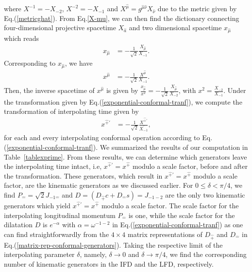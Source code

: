 \documentclass[%
 reprint,
superscriptaddress,
 amsmath,amssymb,
 aps,
]{revtex4-2}
\begin{document}
where ${X}^{-1}=-{X}_{-2}$, ${X}^{-2}=-{X}_{-1}$ and $X^{\hat \mu}=g^{\hat{\mu}\hat{\nu}}X_{\hat{\nu}}$ due to the metric
given by Eq.(\ref{metricghat}).
From Eq.\eqref{X-mu}, we can then find 
the dictionary connecting four-dimensional projective spacetime $X_{\hat{a}}$ and two dimensional spacetime $x_{\hat{\mu}}$ which reads
\begin{align}
    x_{\hat{\mu}}&=-\frac{1}{\sqrt{2}}\frac{{X}_{\hat{\mu}}}{ {X}_{-1}}.
\end{align}
Corresponding to $x_{\hat{\mu}}$, we have  
\begin{align}
    x^{\hat{\mu}}&=-\frac{1}{\sqrt{2}}\frac{{X}^{\hat{\mu}}}{ {X}_{-1}}.
\end{align}
Then, the inverse spacetime of $x^{\hat{\mu}}$ is given by $\frac{x_{\hat{\mu}}}{x^2}=-\frac{1}{\sqrt{2}}\frac{{X}_{\hat{\mu}}}{{X}_{-2}}$, with $x^2=\frac{{X}_{-2}}{{X}_{-1}}$. Under the transformation given by Eq.(\ref{exponential-conformal-tranf}), we compute the transformation of interpolating time given by
\begin{align}
    x^{\hat{+}\prime}&=-\frac{1}{\sqrt{2}}\frac{{X}^{\hat{+}\prime}}{ {X}^{\prime}_{-1}},
\end{align}
for each and every interpolating conformal operation according to Eq.(\ref{exponential-conformal-tranf}). We summarized the results of our computation in Table~\ref{tablexprime}.
From these results, we can determine which generators leave the interpolating time intact, i.e, $x^{\hat{+}\prime} = x^{\hat{+}}$ modulo a scale factor, before and after the transformation. These generators, which result in $x^{\hat{+}\prime}=x^{\hat{+}}$ modulo a scale factor, are the kinematic generators as we discussed earlier. For $0\leq \delta < \pi/4$, we find $P_{\hat -} = \sqrt{2}J_{-1\hat{-}}$ and $D=\left(D_{\hat{+}}c+D_{\hat{-}}s\right)=J_{-1 -2}$ are the only two kinematic generators which yield $x^{\hat{+}\prime}=x^{\hat{+}}$ modulo a scale factor.
The scale factor for the interpolating longitudinal momentum $P_{\hat{-}}$ is one, while the scale factor for the dilatation $D$ is $e^{-\alpha}$ with $\alpha=\omega^{-1-2}$ in Eq.(\ref{exponential-conformal-tranf}) as one can find straightforwardly from the $4\times4$ matrix representations of $D_{\hat{+}}$ and $D_{\hat{-}}$ in Eq.(\ref{matrix-rep-conformal-generators}). 
Taking the respective limit of the interpolating parameter $\delta$, namely,  
$\delta \to 0$ and $\delta \to \pi/4$, we find the corresponding number of kinematic generators in the IFD and the LFD, respectively. 
%
\end{document}
